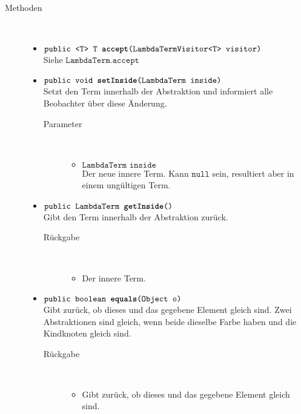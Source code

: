 \begin{description}
\item[Methoden] \hfill \\
	\vspace{-.8cm}
	\begin{itemize}
		\item $\texttt{public <T> T \textbf{accept}(LambdaTermVisitor<T> visitor)}$ \\ Siehe $\texttt{LambdaTerm.accept}$
		
		\item $\texttt{public void \textbf{setInside}(LambdaTerm inside)}$ \\ Setzt den Term innerhalb der Abstraktion und informiert alle Beobachter über diese Änderung.
		\begin{description}
			\item[Parameter] \hfill \\
			\vspace{-.8cm}
			\begin{itemize}
				\item $\texttt{LambdaTerm inside}$ \\ Der neue innere Term. Kann $\texttt{null}$ sein, resultiert aber in einem ungültigen Term.
			\end{itemize}
		\end{description}
		
		\item $\texttt{public LambdaTerm \textbf{getInside}()}$ \\ Gibt den Term innerhalb der Abstraktion zurück.
		\begin{description}
			\item[Rückgabe] \hfill \\
			\vspace{-.8cm}
			\begin{itemize}
				\item Der innere Term.
			\end{itemize}
		\end{description}
		
		\item $\texttt{public boolean \textbf{equals}(Object o)}$ \\ Gibt zurück, ob dieses und das gegebene Element gleich sind. Zwei Abstraktionen sind gleich, wenn beide dieselbe Farbe haben und die Kindknoten gleich sind.
		\begin{description}
			\item[Rückgabe] \hfill \\
			\vspace{-.8cm}
			\begin{itemize}
				\item Gibt zurück, ob dieses und das gegebene Element gleich sind.
			\end{itemize}
		\end{description}
	\end{itemize}
\end{description}

